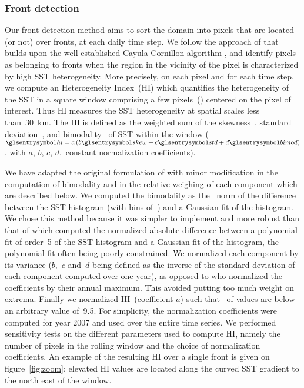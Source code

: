 \subsubsection{Front detection}

Our front detection method aims to sort the domain into pixels that are located (or not) over fronts, at each daily time step.
We follow the approach of \textcite{liu_2016} that builds upon the well established Cayula-Cornillon algorithm \parencite{cayula_1992, belkin_2009}, and identify pixels as belonging to fronts when the region in the vicinity of the pixel is characterized by high SST heterogeneity.
More precisely, on each pixel and for each time step, we compute an Heterogeneity Index~(HI) which quantifies the heterogeneity of the SST in a square window comprising a few pixels~() centered on the pixel of interest.
Thus HI measures the SST heterogeneity at spatial scales less than~\qty{30}{\km}.
The HI is defined as the weighted sum of the skewness~, standard deviation~, and bimodality~ of SST within the window (\(\am{hi} = a \left( b \am{skew} + c \am{std} + d \am{bimod} \right)\), with \(a\), \(b\), \(c\), \(d\),~constant normalization coefficients).

We have adapted the original formulation of \textcite{liu_2016} with minor modification in the computation of bimodality and in the relative weighing of each component which are described below.
We computed the bimodality as the ~norm of the difference between the SST histogram (with bins of~) and a Gaussian fit of the histogram.
We chose this method because it was simpler to implement and more robust than that of \textcite{liu_2016} which computed the normalized absolute difference between a polynomial fit of order~5 of the SST histogram and a Gaussian fit of the histogram, the polynomial fit often being poorly constrained.
We normalized each component by its variance (\(b\),~\(c\) and~\(d\) being defined as the inverse of the standard deviation of each component computed over one year), as opposed to \textcite{liu_2016} who normalized the coefficients by their annual maximum.
This avoided putting too much weight on extrema.
Finally we normalized HI~(coefficient \(a\)) such that~ of values are below an arbitrary value of~9.5.
For simplicity, the normalization coefficients were computed for year 2007 and used over the entire time series.
We performed sensitivity tests on the different parameters used to compute HI, namely the number of pixels in the rolling window and the choice of normalization coefficients.
An example of the resulting HI over a single front is given on figure~\ref{fig:zoom}; elevated HI values are located along the curved SST gradient to the north east of the window.

